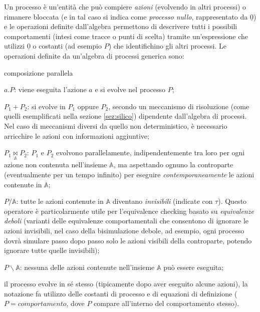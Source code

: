 	Un processo \`e un'entit\`a che pu\`o compiere \emph{azioni} (evolvendo in altri processi) o rimanere bloccata (e in tal caso si indica come \emph{processo nullo}, rappresentato da $\underline{0}$) e le operazioni definite dall'algebra permettono di descrivere tutti i possibili comportamenti (intesi come tracce o punti di scelta) tramite un'espressione che utilizzi $\underline{0}$ o costanti (ad esempio $P$) che identifichino gli altri processi. Le operazioni definite da un'algebra di processi generica sono:
	\begin{labeling}{composizione parallela}
		\item [prefisso d'azione] $a.P$: viene eseguita l'azione $a$ e si evolve nel processo $P$;
		\item [scelta] $P_1 + P_2$: si evolve in $P_1$ oppure $P_2$, secondo un meccanismo di risoluzione (come quelli esemplificati nella sezione \ref{sez:silico}) dipendente dall'algebra di processi. Nel caso di meccanismi diversi da quello non deterministico, \`e necessario arricchire le azioni con informazioni aggiuntive;
		\item [composizione parallela] $P_1 \underset{\mathbb{A}}{\bowtie} P_2$: $P_1$ e $P_2$ evolvono parallelamente, indipendentemente tra loro per ogni azione non contenuta nell'insieme $\mathbb{A}$, ma aspettando ognuno la controparte (eventualmente per un tempo infinito) per eseguire \emph{contemporaneamente} le azioni contenute in $\mathbb{A}$;
		\item [hiding] $P / \mathbb{A}$: tutte le azioni contenute in $\mathbb{A}$ diventano \emph{invisibili} (indicate con $\tau$). Questo operatore \`e particolarmente utile per l'equivalence checking basato su \emph{equivalenze deboli} (varianti delle equivalenze comportamentali che consentono di ignorare le azioni invisibili, nel caso della bisimulazione debole, ad esempio, ogni processo dovr\`a simulare passo dopo passo solo le azioni visibili della controparte, potendo ignorare tutte quelle invisibili);
		\item [restrizione] $P \backslash \mathbb{A}$: nessuna delle azioni contenute nell'insieme $\mathbb{A}$ pu\`o essere eseguita;
		\item [ricorsione] il processo evolve in s\'e stesso (tipicamente dopo aver eseguito alcune azioni), la notazione fa utilizzo delle costanti di processo e di equazioni di definizione ($P = comportamento$, dove $P$ compare all'interno del comportamento stesso).
	\end{labeling}
	
